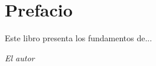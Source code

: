 \chapter*{Prefacio}

Este libro presenta los fundamentos de... 

\vspace{1cm}
\begin{flushright}
\textit{El autor}
\end{flushright}